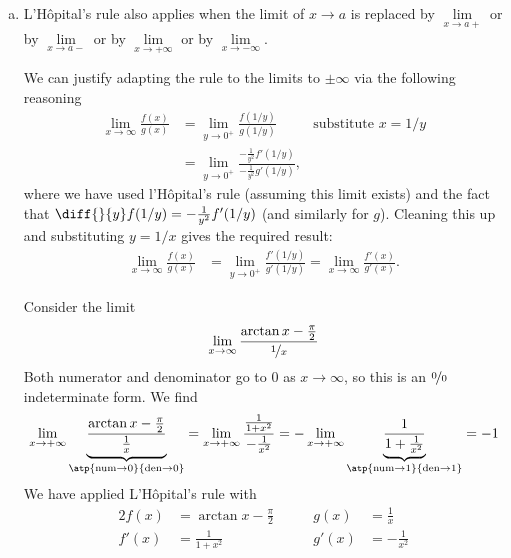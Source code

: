 \begin{enumerate}[(a)]
\item L'H\^opital's rule also applies when the limit of $x \to
a$ is replaced by $\lim\limits_{x\rightarrow a+}$ or by
$\lim\limits_{x\rightarrow a-}$ or by $\lim\limits_{x\rightarrow +\infty}$
or by $\lim\limits_{x\rightarrow -\infty}$.

We can justify adapting the rule to the limits to $\pm \infty$ via the following reasoning
\begin{align*}
  \lim_{x\to \infty} \frac{f(x)}{g(x)}
  &= \lim_{y \to 0^+} \frac{ f(1/y) }{ g(1/y) } & \text{substitute $x=1/y$} \\
  &= \lim_{y \to 0^+} \frac{ -\frac{1}{y^2} f'(1/y) } { -\frac{1}{y^2}g'(1/y)},
\end{align*}
where we have used l'H\^opital's rule (assuming this limit exists) and the fact
that $\diff{}{y} f(1/y) = -\frac{1}{y^2} f'(1/y)$ (and similarly for $g$).
Cleaning this up and substituting $y=1/x$ gives the required result:
\begin{align*}
\lim_{x\to \infty} \frac{f(x)}{g(x)} & =\lim_{y \to 0^+} \frac{f'(1/y)} {g'(1/y)}
  =\lim_{x\to\infty} \frac{f'(x)}{g'(x)}.
\end{align*}

\begin{eg}\label{eg:hopitalH}
Consider the limit
\begin{align*}
  \lim_{x\to\infty} \frac{\arctan x - \frac{\pi}{2}}{ \nicefrac{1}{x} }
\end{align*}
Both numerator and denominator go to $0$ as $x \to\infty$, so this is an $\nicefrac00$
indeterminate form. We find
\begin{align*}
\lim_{x\rightarrow+\infty}\underbrace{\frac{\arctan x-\frac{\pi}{2}}
      {\frac{1}{x}}}_{\atp
        {\mathrm{num}\rightarrow 0}
        {\mathrm{den}\rightarrow 0}}
=\lim_{x\rightarrow +\infty}\frac{\frac{1}{1+x^2}} {-\frac{1}{x^2}}
=-\lim_{x\rightarrow +\infty}\underbrace{\frac{1}{1+\frac{1}{x^2}}}_{\atp
        {\mathrm{num}\rightarrow 1}
        {\mathrm{den}\rightarrow 1}}
=-1
\end{align*}
We have applied L'H\^opital's rule with
\begin{alignat*}{2}
  f(x) &= \arctan x -\frac{\pi}{2}\qquad&
  g(x) &=\frac{1}{x}   \\
  f'(x)&=\frac{1}{1+x^2}&
  g'(x)&=-\frac{1}{x^2}
\end{alignat*}
\end{eg}




\end{enumerate}
